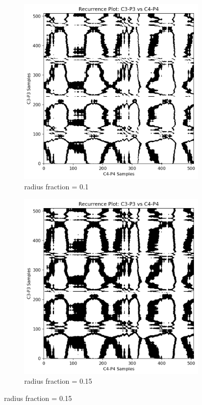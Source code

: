 \documentclass{article}
\begin{document}
				\begin{figure}[htbp]
				    \centering
				    \begin{subfigure}[t]{0.45\textwidth}
					\centering
					\includegraphics[width=\textwidth]{rr_compare/r01_epil.png}
					\caption{radius fraction = 0.1}
					\label{subfig:rp1}
				    \end{subfigure}
				    \hfill %
				    \begin{subfigure}[t]{0.45\textwidth}
					\centering
					\includegraphics[width=\textwidth]{rr_compare/r015_epil.png}
					\caption{radius fraction = 0.15}
					\label{subfig:rp2}
				    \end{subfigure}


\end{figure}
\end{document}
